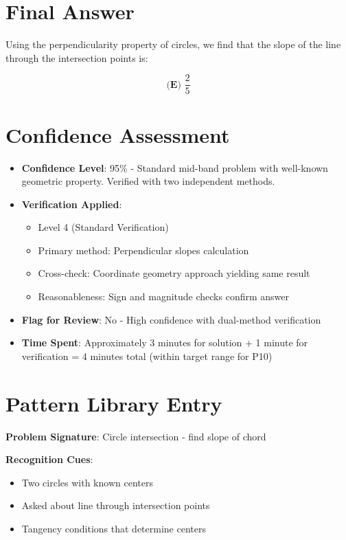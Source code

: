 \documentclass[12pt]{article}
\begin{document}
\section*{Final Answer}

Using the perpendicularity property of circles, we find that the slope of the line through the intersection points is:

\begin{equation*}
\boxed{\textbf{(E) } \frac{2}{5}}
\end{equation*}

\section*{Confidence Assessment}
\begin{itemize}[leftmargin=*]
    \item \textbf{Confidence Level}: 95\% - Standard mid-band problem with well-known geometric property. Verified with two independent methods.
    \item \textbf{Verification Applied}: 
    \begin{itemize}
        \item Level 4 (Standard Verification) 
        \item Primary method: Perpendicular slopes calculation
        \item Cross-check: Coordinate geometry approach yielding same result
        \item Reasonableness: Sign and magnitude checks confirm answer
    \end{itemize}
    \item \textbf{Flag for Review}: No - High confidence with dual-method verification
    \item \textbf{Time Spent}: Approximately 3 minutes for solution + 1 minute for verification = 4 minutes total (within target range for P10)
\end{itemize}

\section*{Pattern Library Entry}

\textbf{Problem Signature}: Circle intersection - find slope of chord

\textbf{Recognition Cues}: 
\begin{itemize}
    \item Two circles with known centers
    \item Asked about line through intersection points
    \item Tangency conditions that determine centers
\end{itemize}
\end{document}
